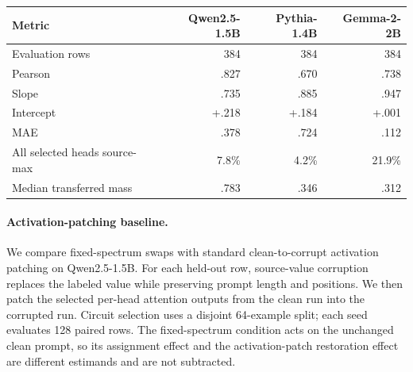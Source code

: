 \documentclass[letterpaper]{article} %
\begin{document}
\noindent\begin{minipage}{\columnwidth}
\centering
\scriptsize
\setlength{\tabcolsep}{2.5pt}
\begin{tabular}{lrrr}
\toprule
Metric & Qwen2.5-1.5B & Pythia-1.4B & Gemma-2-2B \\
\midrule
Evaluation rows & 384 & 384 & 384 \\
Pearson & .827 & .670 & .738 \\
Slope & .735 & .885 & .947 \\
Intercept & +.218 & +.184 & +.001 \\
MAE & .378 & .724 & .112 \\
All selected heads source-max & 7.8\% & 4.2\% & 21.9\% \\
Median transferred mass & .783 & .346 & .312 \\
\bottomrule
\end{tabular}
\label{tab:supp-utility-calibration}
\end{minipage}\par\medskip

\paragraph{Activation-patching baseline.}
We compare fixed-spectrum swaps with standard clean-to-corrupt activation patching on Qwen2.5-1.5B. For each held-out
row, source-value corruption replaces the labeled value while preserving prompt length and positions. We then
patch the selected per-head attention outputs from the clean run into the corrupted run. Circuit selection uses
a disjoint 64-example split; each seed evaluates 128 paired rows. The fixed-spectrum condition acts on the
unchanged clean prompt, so its assignment effect and the activation-patch restoration effect are different
estimands and are not subtracted.
\end{document}
